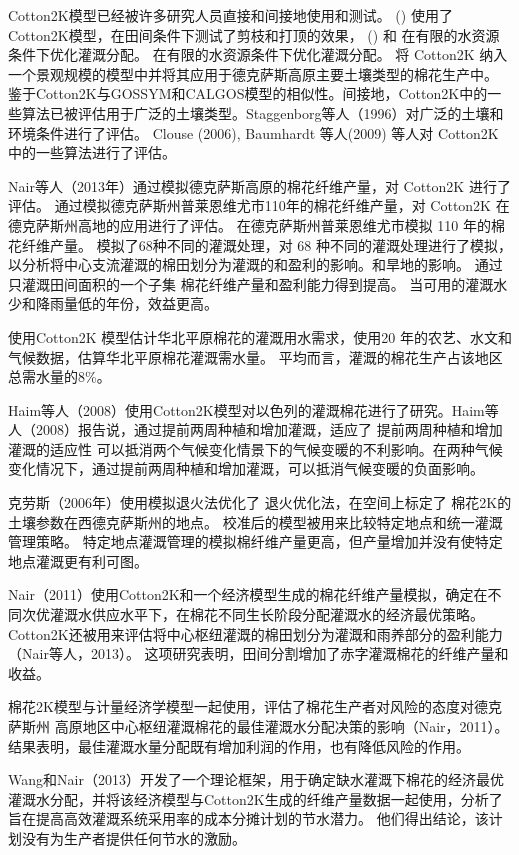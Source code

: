 Cotton2K模型已经被许多研究人员直接和间接地使用和测试。
 (\citeyear{yang2008}) 使用了Cotton2K模型，在田间条件下测试了剪枝和打顶的效果，
 (\citeyear{yang2010}) 和  在有限的水资源条件下优化灌溉分配。
在有限的水资源条件下优化灌溉分配。
 将 Cotton2K 纳入一个景观规模的模型中并将其应用于德克萨斯高原主要土壤类型的棉花生产中。
鉴于Cotton2K与GOSSYM和CALGOS模型的相似性。间接地，Cotton2K中的一些算法已被评估用于广泛的土壤类型。Staggenborg等人（1996）对广泛的土壤和环境条件进行了评估。
Clouse (2006), Baumhardt 等人(2009) 等人对 Cotton2K 中的一些算法进行了评估。

Nair等人（2013年）通过模拟德克萨斯高原的棉花纤维产量，对 Cotton2K 进行了评估。
通过模拟德克萨斯州普莱恩维尤市110年的棉花纤维产量，对 Cotton2K 在德克萨斯州高地的应用进行了评估。
在德克萨斯州普莱恩维尤市模拟 110 年的棉花纤维产量。
模拟了68种不同的灌溉处理，对 68 种不同的灌溉处理进行了模拟，以分析将中心支流灌溉的棉田划分为灌溉的和盈利的影响。和旱地的影响。
通过只灌溉田间面积的一个子集 棉花纤维产量和盈利能力得到提高。
当可用的灌溉水少和降雨量低的年份，效益更高。

\cite{yang2010} 使用Cotton2K 模型估计华北平原棉花的灌溉用水需求，使用20 年的农艺、水文和气候数据，估算华北平原棉花灌溉需水量。
平均而言，灌溉的棉花生产占该地区总需水量的8\%。

Haim等人（2008）使用Cotton2K模型对以色列的灌溉棉花进行了研究。Haim等人（2008）报告说，通过提前两周种植和增加灌溉，适应了 提前两周种植和增加灌溉的适应性 可以抵消两个气候变化情景下的气候变暖的不利影响。在两种气候变化情况下，通过提前两周种植和增加灌溉，可以抵消气候变暖的负面影响。

克劳斯（2006年）使用模拟退火法优化了 退火优化法，在空间上标定了 棉花2K的土壤参数在西德克萨斯州的地点。
校准后的模型被用来比较特定地点和统一灌溉管理策略。
特定地点灌溉管理的模拟棉纤维产量更高，但产量增加并没有使特定地点灌溉更有利可图。

Nair（2011）使用Cotton2K和一个经济模型生成的棉花纤维产量模拟，确定在不同次优灌溉水供应水平下，在棉花不同生长阶段分配灌溉水的经济最优策略。Cotton2K还被用来评估将中心枢纽灌溉的棉田划分为灌溉和雨养部分的盈利能力（Nair等人，2013）。
这项研究表明，田间分割增加了赤字灌溉棉花的纤维产量和收益。

棉花2K模型与计量经济学模型一起使用，评估了棉花生产者对风险的态度对德克萨斯州 高原地区中心枢纽灌溉棉花的最佳灌溉水分配决策的影响（Nair，2011）。
结果表明，最佳灌溉水量分配既有增加利润的作用，也有降低风险的作用。

Wang和Nair（2013）开发了一个理论框架，用于确定缺水灌溉下棉花的经济最优灌溉水分配，并将该经济模型与Cotton2K生成的纤维产量数据一起使用，分析了旨在提高高效灌溉系统采用率的成本分摊计划的节水潜力。
他们得出结论，该计划没有为生产者提供任何节水的激励。

